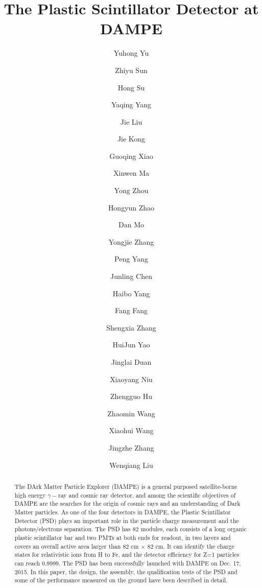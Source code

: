 \documentclass[preprint]{elsarticle}
\begin{document}
\begin{frontmatter}

\title{The Plastic Scintillator Detector at DAMPE}


\author[imp]{Yuhong Yu}

\author[imp]{Zhiyu Sun}

\author[imp]{Hong Su}
\author[imp]{Yaqing Yang}

\author[imp]{Jie Liu}

\author[imp]{Jie Kong}
\author[imp]{Guoqing Xiao}
\author[imp]{Xinwen Ma}
\author[imp]{Yong Zhou}
\author[imp]{Hongyun Zhao}
\author[imp]{Dan Mo}

\author[imp]{Yongjie Zhang}
\author[imp,ucas]{Peng Yang}

\author[imp]{Junling Chen}
\author[imp]{Haibo Yang}
\author[imp]{Fang Fang}
\author[imp]{Shengxia Zhang}

\author[imp]{HuiJun Yao}
\author[imp]{Jinglai Duan}
\author[imp]{Xiaoyang Niu}
\author[imp]{Zhengguo Hu}
\author[imp,ucas]{Zhaomin Wang}
\author[imp]{Xiaohui Wang}
\author[imp]{Jingzhe Zhang}
\author[imp]{Wenqiang Liu}

\address[imp]{Institute of Modern Physics, Chinese Academy of Sciences,  509 Nanchang Road,  Lanzhou,  730000,  P.R.China}

\address[ucas]{Graduate University of the Chinese Academy of Sciences,  19A Yuquan Road,  Beijing,  100049,  P.R.China}


\begin{abstract}

The DArk Matter Particle Explorer (DAMPE) is a general purposed satellite-borne high energy $\gamma-$ray and cosmic ray detector, and among the scientific objectives of DAMPE are the searches for the origin of cosmic rays and an understanding of Dark Matter particles. As one of the four detectors in DAMPE, the Plastic Scintillator Detector (PSD) plays an important role in the particle charge measurement and the photons/electrons separation.
The PSD has 82 modules, each consists of a long organic plastic scintillator bar and two PMTs at both ends for readout, in two layers and covers an overall active area larger than 82 cm $\times$ 82 cm. It can identify the charge states for relativistic ions from H to Fe, and the detector efficiency for Z=1 particles can reach 0.9999. The PSD has been successfully launched with DAMPE on Dec. 17, 2015. In this paper, the design, the assembly, the qualification tests of the PSD and some of the performance measured on the ground have been described in detail.


\end{abstract}
\end{frontmatter}
\end{document}
